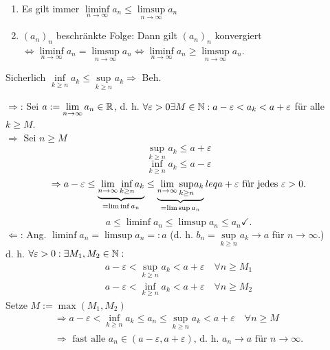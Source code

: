 \begin{lem}
	\begin{enumerate}
		\item Es gilt immer \( \liminf\limits_{n\rightarrow\infty}a_n \leq \limsup\limits_{n\rightarrow\infty}a_n \)
		\item \((a_n)_n\) beschränkte Folge: Dann gilt \((a_n)_n\) konvergiert \( \Leftrightarrow \liminf\limits_{n\rightarrow\infty}a_n = \limsup\limits_{n\rightarrow\infty}a_n \Leftrightarrow \liminf\limits_{n\rightarrow\infty}a_n \geq \limsup\limits_{n\rightarrow\infty}a_n \).
	\end{enumerate}
\end{lem}
\begin{bew}
	\item Sicherlich \( \underset{k\geq n}{\inf}a_k \leq \underset{k\geq n}{\sup} a_k \Rightarrow \) Beh. \checkmark
	\item \glqq\(\Rightarrow \)\grqq: Sei \(a:= \lim\limits_{n\rightarrow\infty}a_n\in\mathbb{R}\), d. h. \( \forall \varepsilon > 0 \exists M\in\mathbb{N}: a-\varepsilon < a_k < a+ \varepsilon \) für alle \(k \geq M \).\\
	\( \Rightarrow \) Sei \(n\geq M\) 
	\[ \underset{k\geq n}{\sup} a_k \leq a+\varepsilon \]
	\[ \underset{k\geq n}{\inf} a_k \leq a-\varepsilon \]
	\[ \Rightarrow a-\varepsilon \leq \underbrace{\lim\limits_{n\rightarrow\infty}\underset{k\geq n}{\inf}a_k}_{=\liminf a_n} \leq \underbrace{\lim\limits_{n\rightarrow\infty}\underset{k\geq n}{\sup}a_k}_{=\limsup a_n}leq a+\varepsilon \text{ für jedes } \varepsilon>0. \]
	\[ a\leq \liminf a_n \leq \limsup a_n \leq a_n \checkmark. \]
	\glqq\(\Leftarrow\)\grqq: Ang. \( \liminf a_n = \limsup a_n =: a \) (d. h. \(b_n =  \underset{k\geq n}{\sup} a_k \rightarrow a \) für \( n\rightarrow\infty \).)\\
	d. h. \( \forall \varepsilon>0: \exists M_1,M_2 \in\mathbb{N}: \)
	\begin{align*}
		a-\varepsilon < \underset{k\geq n}{\sup} a_k < a + \varepsilon \quad \forall n\geq M_1\\
		a-\varepsilon < \underset{k\geq n}{\inf} a_k < a + \varepsilon \quad \forall n\geq M_2
	\end{align*}
	Setze \(M := \max(M_1, M_2) \)\\
	\begin{align*}
		\Rightarrow a-\varepsilon < \underset{k\geq n}{\inf} a_k \leq a_n \leq \underset{k\geq n}{\sup} a_k < a + \varepsilon \quad \forall n\geq M\\
		\Rightarrow \text{ fast alle } a_n\in(a-\varepsilon,a+\varepsilon)\text{, d. h. }a_n\rightarrow a \text{ für } n\rightarrow \infty.
	\end{align*}
\end{bew}
